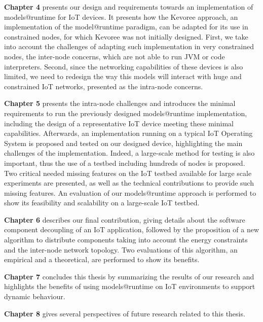 \textbf{Chapter 4} presents our design and requirements towards an implementation of models@runtime for IoT devices.
It presents how the Kevoree approach, an implementation of the model@runtime paradigm, can be adapted for its use in constrained nodes, for which Kevoree was not initially designed.
First, we take into account the challenges of adapting such implementation in very constrained nodes, the inter-node concerns, which are not able to run JVM or code interpreters.
Second, since the networking capabilities of these devices is also limited, we need to redesign the way this models will interact with huge and constrained IoT networks, presented as the intra-node concerns.

\textbf{Chapter 5} presents the intra-node challenges and introduces the minimal requirements to run the previously designed models@runtime implementation, including the design of a representative IoT device meeting these minimal capabilities.
Afterwards, an implementation running on a typical IoT Operating System is proposed and tested on our designed device, highlighting the main challenges of the implementation.
Indeed, a large-scale method for testing is also important, thus the use of a testbed including hundreds of nodes is proposed.
Two critical needed missing features on the IoT testbed available for large scale experiments are presented, as well as the technical contributions to provide such missing features.
An evaluation of our models@runtime approach is performed to show its feasibility and scalability on a large-scale IoT testbed.

\textbf{Chapter 6} describes our final contribution, giving details about the software component decoupling of an IoT application, followed by the proposition of a new algorithm to distribute components taking into account the energy constraints and the inter-node network topology.
Two evaluations of this algorithm, an empirical and a theoretical, are performed to show its benefits.

\textbf{Chapter 7} concludes this thesis by summarizing the results of our research and highlights the benefits of using models@runtime on IoT environments to support dynamic behaviour.

\textbf{Chapter 8} gives several perspectives of future research related to this thesis.